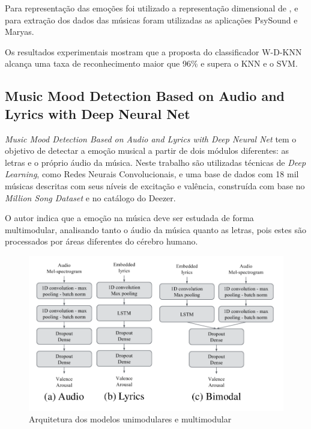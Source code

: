 \documentclass[
	12pt,				%
	openright,			%
	oneside,
	a4paper,			%
	english,			%
	french,				%
	spanish,			%
	brazil				%
	]{abntex2}
\begin{document}
        Para representação das emoções foi utilizado a representação dimensional de , e para extração dos dados das músicas foram utilizadas as aplicações PsySound e Maryas.

        Os resultados experimentais mostram que a proposta do classificador W-D-KNN alcança uma taxa de reconhecimento maior que 96\% e supera o KNN e o SVM.
    \subsection{Music Mood Detection Based on Audio and Lyrics with Deep Neural Net}
        \textit{Music Mood Detection Based on Audio and Lyrics with Deep Neural Net} \cite{DBLP:journals/corr/abs-1809-07276} tem o objetivo de detectar a emoção musical a partir de dois módulos diferentes: as letras e o próprio áudio da música. Neste trabalho são utilizadas técnicas de \textit{Deep Learning}, como Redes Neurais Convolucionais, e uma base de dados com 18 mil músicas descritas com seus níveis de excitação e valência, construída com base no \textit{Million Song Dataset}\cite{Bertin-mahieux11themillion} e no catálogo do Deezer.
    
        O autor indica que a emoção na música deve ser estudada de forma multimodular, analisando tanto o áudio da música quanto as letras, pois estes são processados por áreas diferentes do cérebro humano.
    
        \begin{figure}[ht]
            \caption{\label{fig_deezer_multimodal}Arquitetura dos modelos unimodulares e multimodular}
            \includegraphics[width=\textwidth]{Deezer_MultiModal_Architecture.png}
        \end{figure}
    
\end{document}
